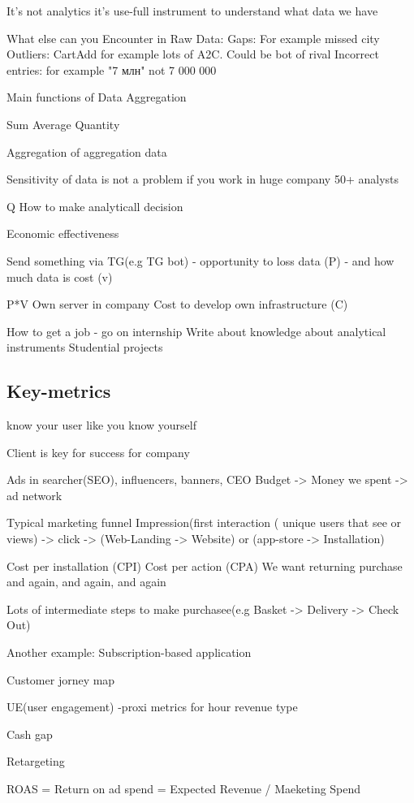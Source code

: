 \documentclass[12pt, a4paper, oneside]{article}
\begin{document}
 It's not analytics it's use-full instrument to understand what data we have 


 What else can you Encounter in Raw Data:
 Gaps: For example missed city 
 Outliers: CartAdd for example lots of A2C. Could be bot of rival
 Incorrect entries: for example "7 млн" not 7 000 000 

 Main functions of Data Aggregation

 Sum
 Average
 Quantity

 Aggregation of aggregation data 

 Sensitivity of data is not a problem if you work in huge company 50+ analysts 


 Q How to make analyticall decision  

 Economic effectiveness 

 Send something via TG(e.g TG bot)
- opportunity to loss data (P)
- and how much data is cost (v)

P*V
Own server in company 
Cost to develop own infrastructure (C)


How to get a job - go on internship
Write about knowledge about analytical instruments 
Studential projects 
\subsection{Key-metrics}
know your user like you know yourself 

Client is key for success for company 

Ads in searcher(SEO), influencers, banners, CEO 
Budget -> Money we spent -> ad network 

Typical marketing funnel
Impression(first interaction ( unique users that see or views) -> click -> (Web-Landing -> Website) or (app-store -> Installation) 

Cost per installation (CPI) 
Cost per action (CPA)
We want returning purchase and again, and again, and again 

Lots of intermediate steps to make purchasee(e.g Basket -> Delivery -> Check Out) 

Another example: 
Subscription-based application 

Customer jorney map 

UE(user engagement) -proxi metrics for hour revenue type 


Cash gap


Retargeting 

ROAS = Return on ad spend = Expected Revenue / Maeketing Spend 
\end{document}
